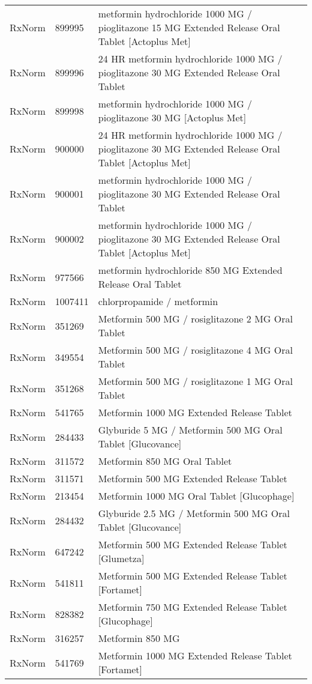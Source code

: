 \begin{longtable}{p{}p{}p{}}
  RxNorm & 899995 & metformin hydrochloride 1000 MG / pioglitazone 15 MG Extended Release Oral Tablet [Actoplus Met] \\ 
  RxNorm & 899996 & 24 HR metformin hydrochloride 1000 MG / pioglitazone 30 MG Extended Release Oral Tablet \\ 
  RxNorm & 899998 & metformin hydrochloride 1000 MG / pioglitazone 30 MG [Actoplus Met] \\ 
  RxNorm & 900000 & 24 HR metformin hydrochloride 1000 MG / pioglitazone 30 MG Extended Release Oral Tablet [Actoplus Met] \\ 
  RxNorm & 900001 & metformin hydrochloride 1000 MG / pioglitazone 30 MG Extended Release Oral Tablet \\ 
  RxNorm & 900002 & metformin hydrochloride 1000 MG / pioglitazone 30 MG Extended Release Oral Tablet [Actoplus Met] \\ 
  RxNorm & 977566 & metformin hydrochloride 850 MG Extended Release Oral Tablet \\ 
  RxNorm & 1007411 & chlorpropamide / metformin \\ 
  RxNorm & 351269 & Metformin 500 MG / rosiglitazone 2 MG Oral Tablet \\ 
  RxNorm & 349554 & Metformin 500 MG / rosiglitazone 4 MG Oral Tablet \\ 
  RxNorm & 351268 & Metformin 500 MG / rosiglitazone 1 MG Oral Tablet \\ 
  RxNorm & 541765 & Metformin 1000 MG Extended Release Tablet \\ 
  RxNorm & 284433 & Glyburide 5 MG / Metformin 500 MG Oral Tablet [Glucovance] \\ 
  RxNorm & 311572 & Metformin 850 MG Oral Tablet \\ 
  RxNorm & 311571 & Metformin 500 MG Extended Release Tablet \\ 
  RxNorm & 213454 & Metformin 1000 MG Oral Tablet [Glucophage] \\ 
  RxNorm & 284432 & Glyburide 2.5 MG / Metformin 500 MG Oral Tablet [Glucovance] \\ 
  RxNorm & 647242 & Metformin 500 MG Extended Release Tablet [Glumetza] \\ 
  RxNorm & 541811 & Metformin 500 MG Extended Release Tablet [Fortamet] \\ 
  RxNorm & 828382 & Metformin 750 MG Extended Release Tablet [Glucophage] \\ 
  RxNorm & 316257 & Metformin 850 MG \\ 
  RxNorm & 541769 & Metformin 1000 MG Extended Release Tablet [Fortamet] \\ 

\end{longtable}

